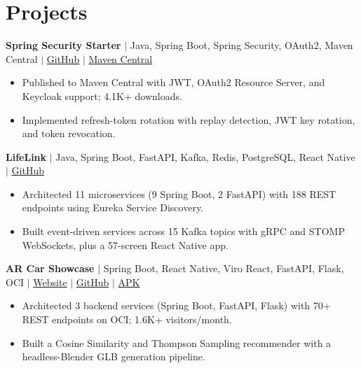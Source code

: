 \documentclass[letterpaper,10pt]{article}
\begin{document}
\vspace{-4pt}


\section{Projects}

\textbf{Spring Security Starter} $|$ Java, Spring Boot, Spring Security, OAuth2, Maven Central $|$
\href{https://github.com/AdepuSriCharan/spring-security-starter}{GitHub} $|$
\href{https://central.sonatype.com/artifact/io.github.adepusricharan/security-starter}{Maven Central}

\begin{itemize}[leftmargin=*, itemsep=0pt, topsep=1pt]
\item Published to Maven Central with JWT, OAuth2 Resource Server, and Keycloak support; 4.1K+ downloads.
\item Implemented refresh-token rotation with replay detection, JWT key rotation, and token revocation.
\end{itemize}

\vspace{-4pt}

\textbf{LifeLink} $|$ Java, Spring Boot, FastAPI, Kafka, Redis, PostgreSQL, React Native $|$
\href{https://github.com/LifeLink-The-Digital-Bridge}{GitHub}

\begin{itemize}[leftmargin=*, itemsep=0pt, topsep=1pt]
\item Architected 11 microservices (9 Spring Boot, 2 FastAPI) with 188 REST endpoints using Eureka Service Discovery.
\item Built event-driven services across 15 Kafka topics with gRPC and STOMP WebSockets, plus a 57-screen React Native app.
\end{itemize}

\vspace{-4pt}

\textbf{AR Car Showcase} $|$ Spring Boot, React Native, Viro React, FastAPI, Flask, OCI $|$
\href{https://arcarshowcase.com}{Website} $|$
\href{https://github.com/AR-Car-Showcase}{GitHub} $|$
\href{https://github.com/AR-Car-Showcase/mobile-app/releases/latest}{APK}

\begin{itemize}[leftmargin=*, itemsep=0pt, topsep=1pt]
\item Architected 3 backend services (Spring Boot, FastAPI, Flask) with 70+ REST endpoints on OCI; 1.6K+ visitors/month.
\item Built a Cosine Similarity and Thompson Sampling recommender with a headless-Blender GLB generation pipeline.
\end{itemize}
\end{document}
